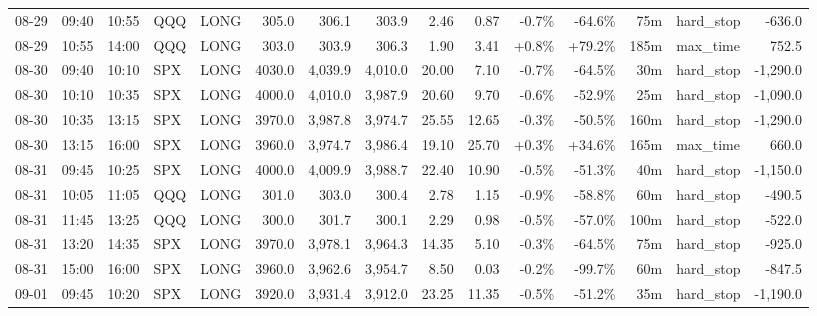\documentclass[11pt,a4paper,twoside]{article}
\begin{document}
\begin{landscape}
\begin{center}
\begin{longtable}{>{\color{txtmain}}l l l l l r r r r r r r r >{\color{txtmain}}l r}
08-29 & 09:40 & 10:55 & QQQ & LONG & 305.0 & 306.1 & 303.9 & 2.46 & 0.87 & \textcolor{lossred}{-0.7\%} & \textcolor{lossred}{-64.6\%} & 75m & hard\_stop & \textcolor{lossred}{-636.0} \\
08-29 & 10:55 & 14:00 & QQQ & LONG & 303.0 & 303.9 & 306.3 & 1.90 & 3.41 & \textcolor{wingreen}{+0.8\%} & \textcolor{wingreen}{+79.2\%} & 185m & max\_time & \textcolor{wingreen}{752.5} \\
08-30 & 09:40 & 10:10 & SPX & LONG & 4030.0 & 4,039.9 & 4,010.0 & 20.00 & 7.10 & \textcolor{lossred}{-0.7\%} & \textcolor{lossred}{-64.5\%} & 30m & hard\_stop & \textcolor{lossred}{-1,290.0} \\
08-30 & 10:10 & 10:35 & SPX & LONG & 4000.0 & 4,010.0 & 3,987.9 & 20.60 & 9.70 & \textcolor{lossred}{-0.6\%} & \textcolor{lossred}{-52.9\%} & 25m & hard\_stop & \textcolor{lossred}{-1,090.0} \\
08-30 & 10:35 & 13:15 & SPX & LONG & 3970.0 & 3,987.8 & 3,974.7 & 25.55 & 12.65 & \textcolor{lossred}{-0.3\%} & \textcolor{lossred}{-50.5\%} & 160m & hard\_stop & \textcolor{lossred}{-1,290.0} \\
08-30 & 13:15 & 16:00 & SPX & LONG & 3960.0 & 3,974.7 & 3,986.4 & 19.10 & 25.70 & \textcolor{wingreen}{+0.3\%} & \textcolor{wingreen}{+34.6\%} & 165m & max\_time & \textcolor{wingreen}{660.0} \\
08-31 & 09:45 & 10:25 & SPX & LONG & 4000.0 & 4,009.9 & 3,988.7 & 22.40 & 10.90 & \textcolor{lossred}{-0.5\%} & \textcolor{lossred}{-51.3\%} & 40m & hard\_stop & \textcolor{lossred}{-1,150.0} \\
08-31 & 10:05 & 11:05 & QQQ & LONG & 301.0 & 303.0 & 300.4 & 2.78 & 1.15 & \textcolor{lossred}{-0.9\%} & \textcolor{lossred}{-58.8\%} & 60m & hard\_stop & \textcolor{lossred}{-490.5} \\
08-31 & 11:45 & 13:25 & QQQ & LONG & 300.0 & 301.7 & 300.1 & 2.29 & 0.98 & \textcolor{lossred}{-0.5\%} & \textcolor{lossred}{-57.0\%} & 100m & hard\_stop & \textcolor{lossred}{-522.0} \\
08-31 & 13:20 & 14:35 & SPX & LONG & 3970.0 & 3,978.1 & 3,964.3 & 14.35 & 5.10 & \textcolor{lossred}{-0.3\%} & \textcolor{lossred}{-64.5\%} & 75m & hard\_stop & \textcolor{lossred}{-925.0} \\
08-31 & 15:00 & 16:00 & SPX & LONG & 3960.0 & 3,962.6 & 3,954.7 & 8.50 & 0.03 & \textcolor{lossred}{-0.2\%} & \textcolor{lossred}{-99.7\%} & 60m & hard\_stop & \textcolor{lossred}{-847.5} \\
09-01 & 09:45 & 10:20 & SPX & LONG & 3920.0 & 3,931.4 & 3,912.0 & 23.25 & 11.35 & \textcolor{lossred}{-0.5\%} & \textcolor{lossred}{-51.2\%} & 35m & hard\_stop & \textcolor{lossred}{-1,190.0} \\

\end{longtable}
\end{center}
\end{landscape}
\end{document}
